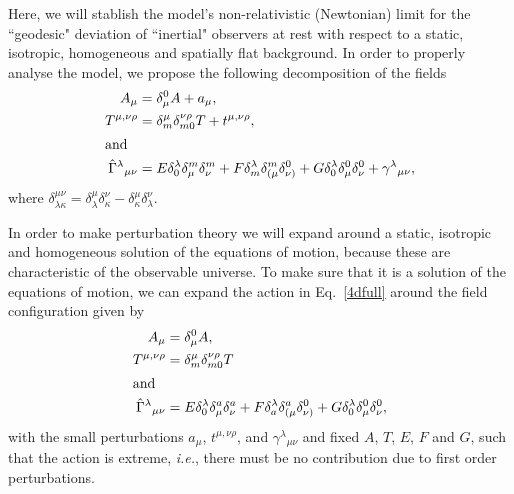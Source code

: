 \documentclass[twocolumn,
  showpacs,showkeys,prd,superscriptaddress]{revtex4-1}
\begin{document}
Here, we will stablish the model's non-relativistic (Newtonian) limit for the ``geodesic" deviation of ``inertial" observers at rest with respect to a static, isotropic, homogeneous and spatially flat background. In order to properly analyse the model, we  propose the following decomposition of the fields
\begin{align}
  A_\mu &= \delta_\mu^0 A + a_\mu,\\
  T^{\mu,\nu\rho} &= \delta^{\mu}_m\delta^{\nu\rho}_{m0}T + t^{\mu,\nu\rho},\\
  \shortintertext{and}
  \hat{\Gamma}^\lambda{}_{\mu\nu} &= E \delta^\lambda_0 \delta^m_\mu \delta^m_\nu + F \delta^\lambda_m \delta^m_{(\mu}\delta^0_{\nu)} + G\delta^\lambda_0 \delta^0_{\mu}\delta^0_{\nu} + \gamma^\lambda{}_{\mu\nu},
\end{align}
where $\delta^{\mu\nu}_{\lambda\kappa}=\delta^{\mu}_{\lambda}\delta^{\nu}_{\kappa}-\delta^{\mu}_{\kappa}\delta^{\nu}_{\lambda}$.%

In order to make perturbation theory we will expand around a static, isotropic and homogeneous solution of the equations of motion, because these are characteristic of the observable universe. To make sure that it is a solution of the equations of motion, we can expand the action in Eq.~\eqref{4dfull} around the field configuration given by
\begin{align}
  A_\mu &= \delta_\mu^0 A,\\
  T^{\mu,\nu\rho} &= \delta^{\mu}_m \delta^{\nu \rho}_{m 0} T\\
  \shortintertext{and}
  \hat{\Gamma}^\lambda{}_{\mu\nu} &= E \delta^\lambda_0 \delta^a_\mu\delta^a_\nu + F\delta^\lambda_a \delta^a_{(\mu}\delta^0_{\nu)} + G\delta^\lambda_0 \delta^0_{\mu}\delta^0_{\nu},
\end{align}
with the small perturbations $a_\mu$, $t^{\mu,\nu\rho}$, and $\gamma^\lambda{}_{\mu\nu}$ and fixed $A$,  $T$, $E$, $F$ and $G$, such that the action is extreme, \emph{i.e.}, there must be no contribution due to first order perturbations.
\end{document}
